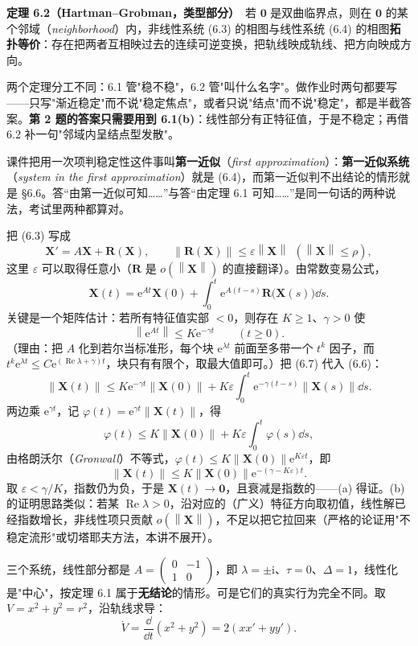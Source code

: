 \documentclass[11pt]{ctexart}
\newcommand{\X}{\mathbf{X}}\newcommand{\Y}{\mathbf{Y}}
\newcommand{\eps}{\varepsilon}
\newcommand{\norm}[1]{\left\lVert#1\right\rVert}
\newcommand{\EN}[1]{\textcolor{inkgray}{\itshape #1}}
\begin{document}
\textbf{定理 6.2（Hartman–Grobman，类型部分）}\ 若 $\mathbf{0}$ 是双曲临界点，则在 $\mathbf{0}$ 的某个邻域（\EN{neighborhood}）内，非线性系统 (6.3) 的相图与线性系统 (6.4) 的相图\textbf{拓扑等价}：存在把两者互相映过去的连续可逆变换，把轨线映成轨线、把方向映成方向。

两个定理分工不同：6.1 管"稳不稳"，6.2 管"叫什么名字"。做作业时两句都要写——只写"渐近稳定"而不说"稳定焦点"，或者只说"结点"而不说"稳定"，都是半截答案。\textbf{第 2 题的答案只需要用到 6.1(b)}：线性部分有正特征值，于是不稳定；再借 6.2 补一句"邻域内呈结点型发散"。

课件把用一次项判稳定性这件事叫\textbf{第一近似}（\EN{first approximation}）：\textbf{第一近似系统}（\EN{system in the first approximation}）就是 (6.4)，而第一近似判不出结论的情形就是 §6.6。答“由第一近似可知……”与答“由定理 6.1 可知……”是同一句话的两种说法，考试里两种都算对。


把 (6.3) 写成
\[
\X'=A\X+\mathbf{R}(\X),\qquad \norm{\mathbf{R}(\X)}\le\eps\norm{\X}\ \ (\norm{\X}\le\rho),
\tag{6.5}
\]
这里 $\eps$ 可以取得任意小（$\mathbf{R}$ 是 $o(\norm{\X})$ 的直接翻译）。由常数变易公式，
\[
\X(t)=\mathrm{e}^{At}\X(0)+\int_0^{t}\mathrm{e}^{A(t-s)}\mathbf{R}\big(\X(s)\big)\dd s .
\tag{6.6}
\]
关键是一个矩阵估计：若所有特征值实部 $<0$，则存在 $K\ge1$、$\gamma>0$ 使
\[
\norm{\mathrm{e}^{At}}\le K\mathrm{e}^{-\gamma t}\qquad(t\ge0).
\tag{6.7}
\]
（理由：把 $A$ 化到若尔当标准形，每个块 $\mathrm{e}^{\lambda t}$ 前面至多带一个 $t^{k}$ 因子，而 $t^{k}\mathrm{e}^{\lambda t}\le C\mathrm{e}^{(\operatorname{Re}\lambda+\gamma)t}$，块只有有限个，取最大值即可。）把 (6.7) 代入 (6.6)：
\[
\norm{\X(t)}\le K\mathrm{e}^{-\gamma t}\norm{\X(0)}+K\eps\int_0^{t}\mathrm{e}^{-\gamma(t-s)}\norm{\X(s)}\dd s .
\]
两边乘 $\mathrm{e}^{\gamma t}$，记 $\varphi(t)=\mathrm{e}^{\gamma t}\norm{\X(t)}$，得
\[
\varphi(t)\le K\norm{\X(0)}+K\eps\int_0^{t}\varphi(s)\dd s ,
\]
由格朗沃尔（\EN{Gronwall}）不等式，$\varphi(t)\le K\norm{\X(0)}\mathrm{e}^{K\eps t}$，即
\[
\norm{\X(t)}\le K\norm{\X(0)}\mathrm{e}^{-({\gamma-K\eps})t}.
\]
取 $\eps<\gamma/K$，指数仍为负，于是 $\X(t)\to\mathbf{0}$，且衰减是指数的——(a) 得证。(b) 的证明思路类似：若某 $\operatorname{Re}\lambda>0$，沿对应的（广义）特征方向取初值，线性解已经指数增长，非线性项只贡献 $o(\norm{\X})$，不足以把它拉回来（严格的论证用"不稳定流形"或切塔耶夫方法，本讲不展开）。


三个系统，线性部分都是 $A=\begin{pmatrix}0&-1\\1&0\end{pmatrix}$，即 $\lambda=\pm\mathrm{i}$、$\tau=0$、$\Delta=1$，线性化是"中心"，按定理 6.1 属于\textbf{无结论}的情形。可是它们的真实行为完全不同。取 $V=x^{2}+y^{2}=r^{2}$，沿轨线求导：
\[
\dot V=\frac{\dd}{\dd t}(x^{2}+y^{2})=2(xx'+yy').
\]
\end{document}
